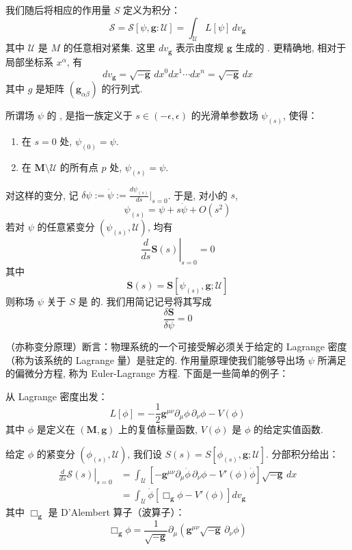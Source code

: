 我们随后将相应的作用量 $S$ 定义为积分：
\[
\mathcal{S} = \mathcal{S}[\psi, \mathbf{g}:\mathcal{U}] = \int_{\mathcal{U}}L[\psi]\, dv_{\mathbf{g}}
\]
其中 $\mathcal{U}$ 是 $M$ 的任意相对紧集. 这里 $dv_{\mathbf{g}}$ 表示由度规 $\mathbf{g}$ 生成的 . 更精确地, 相对于局部坐标系 $x^\alpha$, 有
\[
dv_{\mathbf{g}} = \sqrt{-\mathbf{g}}\, dx^0dx^1\cdots dx^n = \sqrt{-\mathbf{g}}\, dx
\]
其中 $g$ 是矩阵 $(\mathbf{g}_{\alpha\beta})$ 的行列式. 

所谓场 $\psi$ 的 , 是指一族定义于 $s \in (-\epsilon, \epsilon)$ 的光滑单参数场 $\psi_{(s)}$, 使得：
\begin{enumerate}
\item 在 $s = 0$ 处, $\psi_{(0)} = \psi$. 
\item 在 $\mathbf{M} \setminus \mathcal{U}$ 的所有点 $p$ 处, $\psi_{(s)} = \psi$. 
\end{enumerate}

对这样的变分, 记 $\delta\psi := \dot{\psi} := \frac{d\psi_{(s)}}{ds}\Big|_{s=0}$. 于是, 对小的 $s$, 
\[
\psi_{(s)} = \psi + s\dot{\psi} + O(s^2)
\]
若对 $\psi$ 的任意紧变分 $(\psi_{(s)}, \mathcal{U})$, 均有
\[
\left.\frac{d}{ds}\mathbf{S}(s)\right|_{s=0} = 0
\]
其中
\[
\mathbf{S}(s) = \mathbf{S}[\psi_{(s)}, \mathbf{g};\mathcal{U}]
\]
则称场 $\psi$ 关于 $S$ 是  的. 我们用简记记号将其写成
\[
\frac{\delta\mathbf{S}}{\delta\psi} = 0
\]

（亦称变分原理）断言：物理系统的一个可接受解必须关于给定的 Lagrange 密度（称为该系统的 Lagrange 量）是驻定的. 作用量原理使我们能够导出场 $\psi$ 所满足的偏微分方程, 称为 Euler-Lagrange 方程. 下面是一些简单的例子：


从 Lagrange 密度出发：
\[
L[\phi] = -\frac{1}{2}\mathbf{g}^{\mu\nu}\partial_\mu\phi\, \partial_\nu\phi - V(\phi)
\]
其中 $\phi$ 是定义在 $(\mathbf{M}, \mathbf{g})$ 上的复值标量函数, $V(\phi)$ 是 $\phi$ 的给定实值函数. 

给定 $\phi$ 的紧变分 $(\phi_{(s)}, \mathcal{U})$, 我们设 $S(s) = S[\phi_{(s)}, \mathbf{g};\mathcal{U}]$. 分部积分给出：
\[
\begin{aligned}
\left.\frac{d}{ds}\mathcal{S}(s)\right|_{s=0} &= \int_{\mathcal{U}}\left[-\mathbf{g}^{\mu\nu}\partial_\mu\dot{\phi}\, \partial_\nu\phi - V'(\phi)\dot{\phi}\right]\sqrt{-\mathbf{g}}\, dx\\
&= \int_{\mathcal{U}}\dot{\phi}\left[\Box_{\mathbf{g}}\phi - V'(\phi)\right]dv_{\mathbf{g}}
\end{aligned}
\]
其中 $\Box_{\mathbf{g}}$ 是 D'Alembert 算子（波算子）：
\[
\Box_{\mathbf{g}}\phi = \frac{1}{\sqrt{-\mathbf{g}}}\partial_\mu\left(\mathbf{g}^{\mu\nu}\sqrt{-\mathbf{g}}\, \partial_\nu\phi\right)
\]

